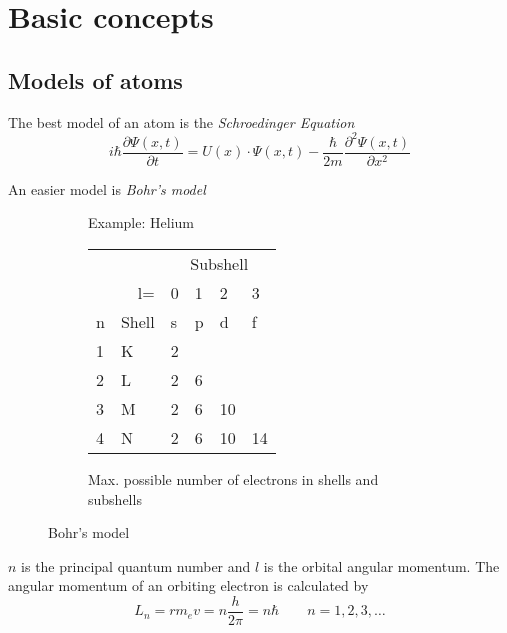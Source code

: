 \section{Basic concepts}

\subsection{Models of atoms}
The best model of an atom is the \emph{Schroedinger Equation}
\begin{equation}
	i \hbar \frac{\partial\Psi(x,t)}{\partial t} = U(x) \cdot \Psi(x,t) - \frac{\hbar}{2m} \frac{\partial^2 \Psi(x,t)}{\partial x^2}
\end{equation}


An easier model is \emph{Bohr's model}

\begin{figure}[ht!]
    \begin{subfigure}[c]{0.48\linewidth}
        \centering
        
        \caption{Example: Helium}
    \end{subfigure}
    \begin{subfigure}[c]{0.48\linewidth}
        \centering
        \begin{tabular}{llllll}
            \toprule
            & & \multicolumn{4}{c}{Subshell} \\
            & \multicolumn{1}{r}{l=} & 0 & 1 & 2 & 3 \\ \cmidrule{2-6}
            n & Shell & s & p & d & f \\
            \midrule
            1 & K & 2 & & & \\
            2 & L & 2 & 6 & & \\
            3 & M & 2 & 6 & 10 & \\
            4 & N & 2 & 6 & 10 & 14 \\
            \bottomrule
        \end{tabular}
        \caption{Max. possible number of electrons in shells and subshells}
    \end{subfigure}
    \caption{Bohr's model}
\end{figure}

$n$ is the principal quantum number and $l$ is the orbital angular momentum.
The angular momentum of an orbiting electron is calculated by
\begin{equation}
	L_n = r m_e v = n \frac{h}{2\pi} = n \hbar \qquad n = 1,2,3,\dots
\end{equation}

